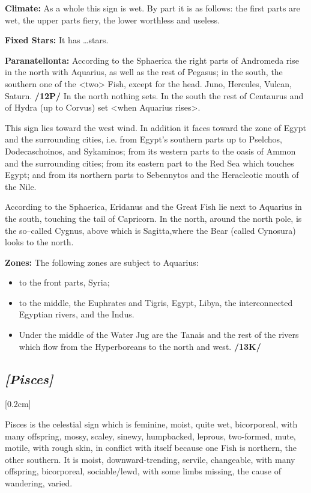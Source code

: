 \textbf{Climate:} As a whole this sign is wet. By part it is as follows: the first parts are wet, the upper parts fiery, the lower worthless and useless. 

\textbf{Fixed Stars:} It has …stars. 

\textbf{Paranatellonta:} According to the Sphaerica the right parts of Andromeda rise in the north with Aquarius, as well as the rest of Pegasus; in the south, the southern one of the <two> Fish, except for the head. Juno, Hercules, Vulcan, Saturn. \textbf{/12P/} In the north nothing sets. In the south
the rest of Centaurus and of Hydra (up to Corvus) set <when Aquarius rises>. 

This sign lies toward the west wind. In addition it faces toward the zone of Egypt and the surrounding cities, i.e. from Egypt’s southern parts up to Pselchos, Dodecaschoinos, and Sykaminos; from its western parts to the oasis of Ammon and the surrounding cities; from its eastern part to the Red Sea which touches Egypt; and from its
northern parts to Sebennytos and the Heracleotic mouth of the Nile.

According to the Sphaerica, Eridanus and the Great Fish lie next to Aquarius in the south, touching the tail of Capricorn. In the north, around the north pole, is the so–called Cygnus, above which is Sagitta,where the Bear (called Cynosura) looks to the north. 

\textbf{Zones:} The following zones are subject to Aquarius:
\begin{itemize}
\item to the front parts, Syria; 
\item to the middle, the Euphrates and Tigris, Egypt, Libya, the interconnected Egyptian rivers, and the Indus. 
\item Under the middle of the Water Jug are the Tanais and the rest of the rivers which flow from the Hyperboreans to the north and west. \textbf{/13K/}
\end{itemize}

\secbr
\subsection{\textit{[Pisces]}}
[0.2cm]

 Pisces is the celestial sign which is  feminine,  moist, quite wet,  bicorporeal, with many offspring, mossy, scaley, sinewy, humpbacked, leprous,  two-formed,  mute, motile, with rough skin, in conflict with itself because one Fish is northern, the other southern. It is moist, downward-trending,  servile, changeable, with many offspring, bicorporeal, sociable/lewd, with some limbs missing, the cause of wandering, varied.

